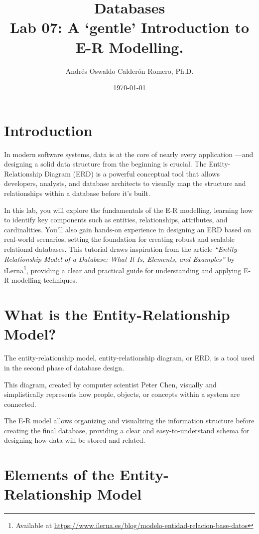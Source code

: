 \documentclass{article}
\title{Databases \\ Lab 07: A `gentle' Introduction to E-R Modelling.}
\author{Andrés Oswaldo Calderón Romero, Ph.D.}
\date{\today}
\begin{document}
\maketitle

\section{Introduction}

In modern software systems, data is at the core of nearly every application —and designing a solid data structure from the beginning is crucial. The Entity-Relationship Diagram (ERD) is a powerful conceptual tool that allows developers, analysts, and database architects to visually map the structure and relationships within a database before it's built.

In this lab, you will explore the fundamentals of the E-R modelling, learning how to identify key components such as entities, relationships, attributes, and cardinalities. You'll also gain hands-on experience in designing an ERD based on real-world scenarios, setting the foundation for creating robust and scalable relational databases. This tutorial draws inspiration from the article \textit{``Entity-Relationship Model of a Database: What It Is, Elements, and Examples''} by iLerna\footnote{Available at \url{https://www.ilerna.es/blog/modelo-entidad-relacion-base-datos}}, providing a clear and practical guide for understanding and applying E-R modelling techniques.

\section{What is the Entity-Relationship Model?}

The entity-relationship model, entity-relationship diagram, or ERD, is a tool used in the second phase of database design.

This diagram, created by computer scientist Peter Chen, visually and simplistically represents how people, objects, or concepts within a system are connected.

The E-R model allows organizing and visualizing the information structure before creating the final database, providing a clear and easy-to-understand schema for designing how data will be stored and related.

\section{Elements of the Entity-Relationship Model}
\end{document}
